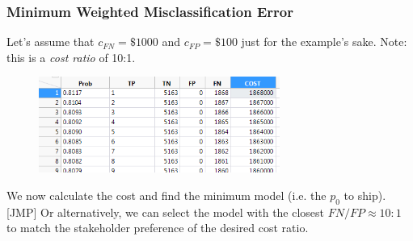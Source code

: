\documentclass[handout]{beamer}
\begin{document}
\begin{frame}\frametitle{Minimum Weighted Misclassification Error}

Let's assume that $c_{FN} = \$1000$ and $c_{FP} = \$100$ just for the example's sake. Note: this is a \emph{cost ratio} of 10:1.

\vspace{-0.2cm}
\begin{figure}
\centering
\hspace{-0.5cm}\includegraphics[width=3.1in]{weighted_misclassification_costs.png}
\end{figure}

We now calculate the cost and find the minimum model (i.e. the $p_0$ to ship). [JMP] \pause Or alternatively, we can select the model with the closest $FN / FP \approx 10:1$ to match the stakeholder preference of the desired cost ratio.



	
\end{frame}
\end{document}
